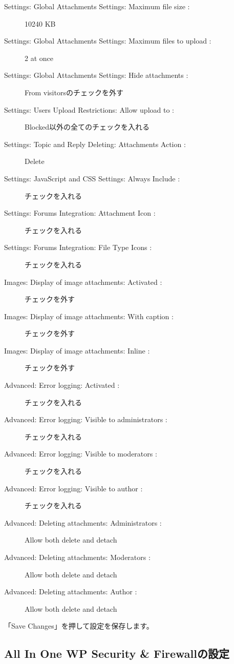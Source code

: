 \documentclass[titlepage,10pt,a4paper,uplatex]{jsbook}
\begin{document}
\begin{description}
\item[Settings: Global Attachments Settings: Maximum file size : ] 10240 KB
\item[Settings: Global Attachments Settings: Maximum files to upload : ] 2 at once
\item[Settings: Global Attachments Settings: Hide attachments : ] From visitorsのチェックを外す
\item[Settings: Users Upload Restrictions: Allow upload to : ] Blocked以外の全てのチェックを入れる
\item[Settings: Topic and Reply Deleting: Attachments Action : ] Delete
\item[Settings: JavaScript and CSS Settings: Always Include : ] チェックを入れる
\item[Settings: Forums Integration: Attachment Icon : ] チェックを入れる
\item[Settings: Forums Integration: File Type Icons : ] チェックを入れる
\item[Images: Display of image attachments: Activated : ] チェックを外す
\item[Images: Display of image attachments: With caption : ] チェックを外す
\item[Images: Display of image attachments: Inline : ] チェックを外す
\item[Advanced: Error logging: Activated : ] チェックを入れる
\item[Advanced: Error logging: Visible to administrators : ] チェックを入れる
\item[Advanced: Error logging: Visible to moderators : ] チェックを入れる
\item[Advanced: Error logging: Visible to author : ] チェックを入れる
\item[Advanced: Deleting attachments: Administrators : ] Allow both delete and detach
\item[Advanced: Deleting attachments: Moderators : ] Allow both delete and detach
\item[Advanced: Deleting attachments: Author : ] Allow both delete and detach
\end{description}

「Save Changes」を押して設定を保存します。

\subsection{All In One WP Security \& Firewallの設定}
\end{document}
